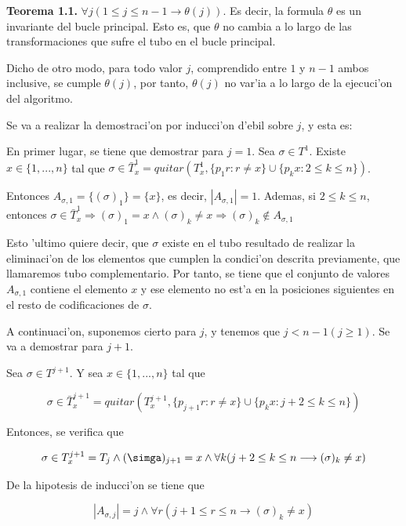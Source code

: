 \documentclass[12pt]{article}
\begin{document}
\textbf{Teorema 1.1.} $\forall j (1 \leq j \leq n-1 \longrightarrow \theta(j))$. Es decir, la formula $\theta$ es un invariante del
bucle principal. Esto es, que $\theta$ no cambia a lo largo de las transformaciones que sufre el tubo en el bucle principal.

Dicho de otro modo, para todo valor $j$, comprendido entre $1$ y $n-1$ ambos inclusive, se cumple $\theta(j)$, por tanto, $\theta(j)$
no var'ia a lo largo de la ejecuci'on del algoritmo.

Se va a realizar la demostraci'on por inducci'on d'ebil sobre $j$, y esta es:

En primer lugar, se tiene que demostrar para $j = 1$. Sea $\sigma \in T^{1}$. Existe $x \in \{1,...,n\}$ tal que
$\sigma \in \bar{T}_{x}^{1} = quitar(T_{x}^{1}, \{p_{1}r : r \neq x\} \cup \{p_{k}x : 2 \leq k \leq n\})$.

Entonces $A_{\sigma,1} = \{(\sigma)_{1}\} = \{x\}$, es decir, $|A_{\sigma,1}| = 1$. Ademas, si $2 \leq k \leq n$, entonces
$\sigma \in \bar{T}_{x}^{1} \Longrightarrow (\sigma)_{1} = x \land (\sigma)_{k} \neq x \Longrightarrow (\sigma)_{k}
 \notin A_{\sigma,1}$

Esto 'ultimo quiere decir, que $\sigma$ existe en el tubo resultado de realizar la eliminaci'on de los elementos que cumplen
la condici'on descrita previamente, que llamaremos tubo complementario. Por tanto, se tiene que el conjunto de valores $A_{\sigma,1}$
contiene el elemento $x$ y ese elemento no est'a en la posiciones siguientes en el resto de codificaciones de $\sigma$.

A continuaci'on, suponemos cierto para $j$, y tenemos que $j < n - 1 (j \geq 1)$. Se va a demostrar para $j+1$.

Sea $\sigma \in T^{j+1}$. Y sea $x \in \{1,...,n\}$ tal que

\begin{equation*}
    \sigma \in \bar{T}_{x}^{j+1} = quitar(T_{x}^{j+1}, \{p_{j+1}r : r \neq x\} \cup \{p_{k}x : j + 2 \leq k \leq n\})
\end{equation*}

Entonces, se verifica que

\begin{equation*}
    \sigma \in T_{x}^{j+1} = T_{j} \land (\simga)_{j+1} = x \land \forall k (j + 2 \leq k \leq n \longrightarrow (\sigma)_{k} \neq x)
\end{equation*}

De la hipotesis de inducci'on se tiene que

\begin{equation*}
    |A_{\sigma,j}| = j \land \forall r (j + 1 \leq r \leq n \longrightarrow (\sigma)_{k} \neq x)
\end{equation*}
\end{document}
